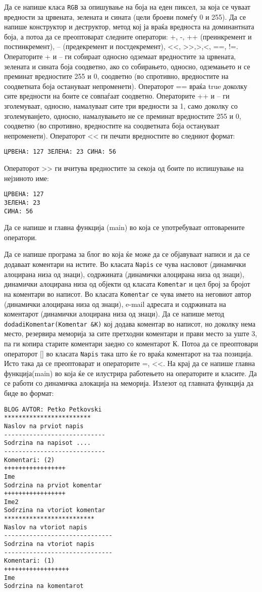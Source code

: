 \documentclass[12pt,a4paper]{exam}
\begin{document}
\begin{questions}
\question
Да се напише класа \texttt{RGB} за опишување на боја на еден пиксел, за која се
чуваат вредности за црвената, зелената и сината (цели броеви помеѓу 0 и 255). Да
се напише конструктор и деструктор, метод кој ја враќа вредноста на доминантната
боја, а потоа да се преоптоварат следните оператори: +, -, ++ (преинкремент и
постинкремент), -- (предекремент и постдекремент), <<, >>,>,<, ==, !=.
Операторите + и – ги собираат односно одземаат вредностите за црвената, зелената
и сината боја соодветно, ако со собирањето, односно, одземањето н  се преминат
вредностите 255 и 0, соодветно (во спротивно, вредностите на соодветната боја
остануваат непроменети). Операторот == враќа true доколку сите вредности на
боите се совпаѓаат соодветно. Операторите ++ и -- ги зголемуваат, односно,
намалуваат сите три вредности за 1, само доколку со зголемуванјето, односно,
намалувањето не се преминат вредностите 255 и 0, соодветно (во спротивно,
вредностите на соодветната боја остануваат непроменети). Операторот << ги печати
вредностите во следниот формат: 
\begin{verbatim}
ЦРВЕНА: 127 ЗЕЛЕНА: 23 СИНА: 56 
\end{verbatim}
Операторот >> ги вчитува вредностите за секоја од боите по испишување на нејзиното име: 
\begin{verbatim}
ЦРВЕНА: 127
ЗЕЛЕНА: 23
СИНА: 56
\end{verbatim}
Да се напише и главна функција (main) во која се употребуваат оптоварените оператори.

\question
Да се напише програма за блог во која ќе може да се објавуваат написи и да се
додаваат коментари на истите. Во класата \texttt{Napis} се чува насловот (динамички
алоцирана низа од знаци), содржината (динамички алоцирана низа од знаци),
динамички алоцирана низа од објекти од класата \texttt{Komentar} и цел број за
бројот на коментари во написот. Во класата \texttt{Komentar} се чува името на
неговиот автор (динамички алоцирана низа од знаци), e-mail адресата и содржината
на коментарот (динамички алоцирана низа од знаци). Да се напише метод
\texttt{dodadiKomentar(Komentar \&K)} кој додава коментар во написот, но доколку
нема место, резервира меморија за сите претходни коментари и прави место за уште
3, па ги копира старите коментари заедно со коментарот К. Потоа да се
преоптовари операторот [] во класата \texttt{Napis} така што ќе го враќа
коментарот на таа позиција. Исто така да се преоптоварат и операторите =, <<. На
крај да се напише главна функција(main) во која ќе се илустрира работењето на
операторите и класите. Да се работи со динамичка алокација на меморија. Излезот
од главната функција да биде во формат:
\begin{verbatim}
BLOG AVTOR: Petko Petkovski
************************
Naslov na prviot napis
----------------------------
Sodrzina na napisot ....
----------------------------
Komentari: (2)
+++++++++++++++++
Ime
Sodrzina na prviot komentar
+++++++++++++++++
Ime2
Sodrzina na vtoriot komentar
*************************
Naslov na vtoriot napis
------------------------------
Sodrzina na vtoriot napis
------------------------------
Komentari: (1)
++++++++++++++++++
Ime
Sodrzina na komentarot
\end{verbatim}

\end{questions}
\end{document}

